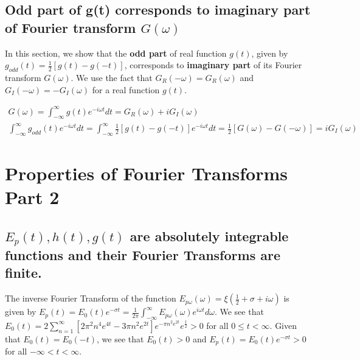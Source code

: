 \documentclass[11pt]{elsarticle}
\begin{document}
\subsection{\label{sec:appendix_I_4} \textbf{Odd part of g(t) corresponds to imaginary part of Fourier transform $G(\omega)$} \protect\\  \lowercase{} }

In this section, we show that the \textbf{odd part} of real function $g(t)$, given by $g_{odd}(t)=\frac{1}{2} [g(t)-g(-t) ] $, corresponds to \textbf{imaginary part} of its Fourier transform $G(\omega)$. We use the fact that $ G_R(-\omega) = G_R(\omega) $ and  $ G_I(-\omega) = -G_I(\omega) $ for a real function $g(t)$.


\begin{eqnarray*}\label{sec_C_4_eq_1}   
G(\omega)=  \int_{-\infty}^{\infty} g(t) e^{-i \omega t} dt = G_R(\omega) + i G_I(\omega)\\
 \int_{-\infty}^{\infty} g_{odd}(t) e^{-i \omega t} dt = \int_{-\infty}^{\infty} \frac{1}{2} [g(t)-g(-t) ] e^{-i\omega t} dt =\frac{1}{2}  [ G(\omega) - G(-\omega)  ] = i G_I(\omega) 
\end{eqnarray*}
\begin{equation} \end{equation}








\section{\label{sec:appendix_C} Properties of Fourier Transforms Part 2 \protect\\  \lowercase{} }

\subsection{\label{sec:appendix_C_1} \textbf{ $E_p(t), h(t), g(t)$ are absolutely integrable functions and their Fourier Transforms are finite. } \protect\\  \lowercase{} }

The inverse Fourier Transform of the function $ E_{p\omega}(\omega)=\xi(\frac{1}{2}+ \sigma + i \omega)$ is given by $E_p(t) = E_0(t) e^{-\sigma t} = \frac{1}{2 \pi} \int_{-\infty}^{\infty} E_{p\omega}(\omega) e^{i \omega t} d\omega $. We see that $E_0(t) = 2 \sum_{n=1}^{\infty}  [ 2 \pi^{2} n^{4} e^{4t}    - 3 \pi n^{2}   e^{2t} ]  e^{- \pi n^{2} e^{2t}} e^{\frac{t}{2}} > 0 $ for all $0 \leq t < \infty$. Given that $E_0(t)=E_0(-t)$, we see that $E_0(t) > 0$ and  $E_p(t) = E_0(t) e^{-\sigma t} > 0 $ for all $-\infty < t < \infty$.\\
\end{document}
